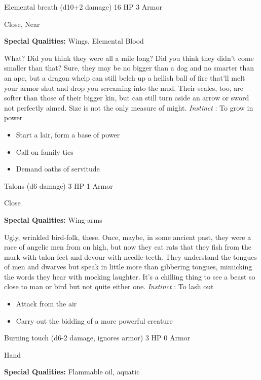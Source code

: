 

 Elemental breath (d10+2 damage) 16 HP 3 Armor


 Close, Near


 \textbf{Special Qualities:}
 Wings, Elemental Blood


 What? Did you think they were all a mile long? Did you think they didn't come smaller than that? Sure, they may be no bigger than a dog and no smarter than an ape, but a dragon whelp can still belch up a hellish ball of fire that'll melt your armor shut and drop you screaming into the mud. Their scales, too, are softer than those of their bigger kin, but can still turn aside an arrow or sword not perfectly aimed. Size is not the only measure of might. \emph{Instinct}
: To grow in power
\begin{itemize}
\item Start a lair, form a base of power
\item Call on family ties
\item Demand oaths of servitude

\end{itemize}




 Talons (d6 damage) 3 HP 1 Armor


 Close


 \textbf{Special Qualities:}
 Wing-arms


 Ugly, wrinkled bird-folk, these. Once, maybe, in some ancient past, they were a race of angelic men from on high, but now they eat rats that they fish from the murk with talon-feet and devour with needle-teeth. They understand the tongues of men and dwarves but speak in little more than gibbering tongues, mimicking the words they hear with mocking laughter. It's a chilling thing to see a beast so close to man or bird but not quite either one. \emph{Instinct}
: To lash out
\begin{itemize}
\item Attack from the air
\item Carry out the bidding of a more powerful creature

\end{itemize}




 Burning touch (d6-2 damage, ignores armor) 3 HP 0 Armor


 Hand


 \textbf{Special Qualities:}
 Flammable oil, aquatic



